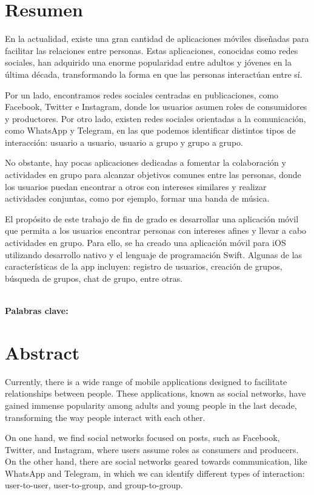 \documentclass{book}
\begin{document}
\begingroup
\chapter{Resumen}
En la actualidad, existe una gran cantidad de aplicaciones 
móviles diseñadas para facilitar las relaciones entre personas. 
Estas aplicaciones, conocidas como redes sociales, han adquirido 
una enorme popularidad entre adultos y jóvenes en la última década, 
transformando la forma en que las personas interactúan entre sí.

Por un lado, encontramos redes sociales centradas en publicaciones, 
como Facebook, Twitter e Instagram, donde los usuarios asumen roles 
de consumidores y productores. Por otro lado, existen redes sociales 
orientadas a la comunicación, como WhatsApp y Telegram, en las que 
podemos identificar distintos tipos de interacción: usuario a usuario, 
usuario a grupo y grupo a grupo.

No obstante, hay pocas aplicaciones dedicadas a fomentar la colaboración 
y actividades en grupo para alcanzar objetivos comunes entre las personas, 
donde los usuarios puedan encontrar a otros con intereses similares y 
realizar actividades conjuntas, como por ejemplo, formar una banda de música.

El propósito de este trabajo de fin de grado es desarrollar una 
aplicación móvil que permita a los usuarios encontrar personas con 
intereses afines y llevar a cabo actividades en grupo. Para ello, 
se ha creado una aplicación móvil para iOS utilizando desarrollo 
nativo y el lenguaje de programación Swift. Algunas de las características 
de la app incluyen: registro de usuarios, creación de grupos, búsqueda de 
grupos, chat de grupo, entre otras.

\textbf{\\\large Palabras clave: }

\chapter{Abstract}
Currently, there is a wide range of mobile applications designed to facilitate 
relationships between people. These applications, known as social networks, 
have gained immense popularity among adults and young people in the last decade, 
transforming the way people interact with each other.

On one hand, we find social networks focused on posts, such as Facebook, 
Twitter, and Instagram, where users assume roles as consumers and producers. 
On the other hand, there are social networks geared towards communication, 
like WhatsApp and Telegram, in which we can identify different types of 
interaction: user-to-user, user-to-group, and group-to-group.
\end{document}
